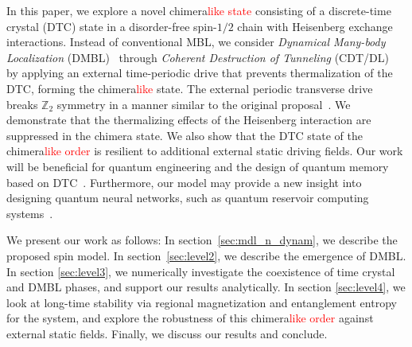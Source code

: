 \documentclass[12pt]{iopart}
\newcommand{\red}[1]{\textcolor{red}{#1}}
\begin{document}
In this paper, we explore a novel chimera\red{like state} consisting of a discrete-time crystal (DTC) state in a disorder-free spin-$1/2$ chain with Heisenberg exchange interactions. Instead of conventional MBL, we consider \textit{Dynamical Many-body Localization} (DMBL)~\cite{Keser2016, haldar_dynamical_2017,haldar_dynamical_2021,bhattacharyya_transverse_2012,aditya2023dynamical,dutta2014,das_exotic_2010} through \textit{Coherent Destruction of Tunneling} (CDT/DL)~\cite{Grossmann1991,Kayanuma2008} by applying an external time-periodic drive that prevents thermalization of the DTC, forming the chimera\red{like} state. The external periodic transverse drive breaks $\mathbb{Z}_2$ symmetry in a manner similar to the original proposal~\cite{sakurai_phys_nodate}. We demonstrate that the thermalizing effects of the Heisenberg interaction are suppressed in the chimera state. We also show that the DTC state of the chimera\red{like order} is resilient to additional external static driving fields. Our work will be beneficial for quantum engineering and the design of quantum memory based on DTC~\cite{zhang_observation_2017}. Furthermore, our model may provide a new insight into designing quantum neural networks, such as quantum reservoir computing systems~\cite{Fujii_2017, Martinez_2021,Mujal_2021, Akitada2022}.

We present our work as follows: In section~\ref{sec:mdl_n_dynam}, we describe the proposed spin model. In section~\ref{sec:level2}, we describe the emergence of DMBL. In section \ref{sec:level3}, we numerically investigate the coexistence of time crystal and DMBL phases, and support our results analytically. In section \ref{sec:level4}, we look at long-time stability via regional magnetization and entanglement entropy for the system, and explore the robustness of this chimera\red{like order} against external static fields. Finally, we discuss our results and conclude.	
	
\end{document}
